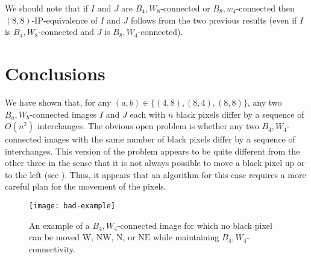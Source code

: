 \documentclass[lotsofwhite,charterfonts]{patmorin}
\newcommand{\N}{\mathrm{N}}
\newcommand{\NE}{\mathrm{NE}}
\newcommand{\W}{\mathrm{W}}
\newcommand{\NW}{\mathrm{NW}}
\begin{document}
We should note that if $I$ and $J$ are $B_4,W_8$-connected or
$B_8,w_4$-connected then $(8,8)$-IP-equivalence of $I$ and $J$ follows
from the two previous results (even if $I$ is $B_4,W_8$-connected and
$J$ is $B_8,W_4$-connected).

\section{Conclusions}

We have shown that, for any $(a,b)\in\{(4,8),(8,4),(8,8)\}$, any two
$B_a,W_b$-connected images $I$ and $J$ each with $n$ black pixels
differ by a sequence of $O(n^2)$ interchanges.   The obvious open
problem is whether any two $B_4,W_4$-connected images with the same
number of black pixels differ by a sequence of interchanges.  This
version of the problem appears to be quite different from the other
three in the sense that it is not always possible to move a black
pixel up or to the left (see ).  Thus, it appears
that an algorithm for this case requires a more careful plan for the
movement of the pixels.


\begin{figure}
\begin{center}
\texttt{[image: bad-example]}
\end{center}
\caption{An example of a $B_4,W_4$-connected image for which no black
pixel can be moved $\W$, $\NW$, $\N$, or $\NE$ while maintaining
$B_4,W_4$-connectivity.}
\end{figure}





\end{document}
